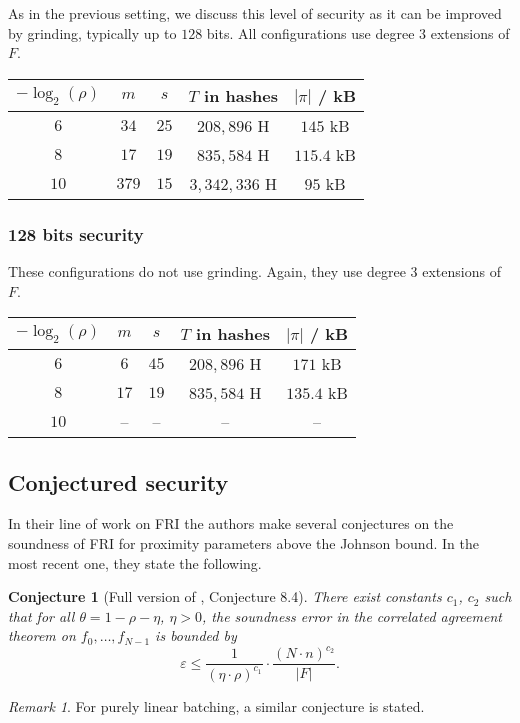 \documentclass[11pt]{article}
\newtheorem{conj}[]{Conjecture}
\theoremstyle{definition}
\theoremstyle{remark}
\newtheorem{rem}[thm]{Remark}
\begin{document}
As in the previous setting, we discuss this level of security as it can be improved by grinding, typically up to $128$ bits. 
All configurations use degree $3$ extensions of $F$.
\begin{center}
\begin{tabular}{|c|c|c|c|c|}
\hline
$-\log_2(\rho)$ & $m$	& $s$	& $T$ in hashes 	& $|\pi|$ / kB
\\\hline\hline
$6$ 	& $34$	& $25$	& $208,896$ H 	& $145$ kB
\\
$8$ & $17$	& $19$	& $835,584$ H & $115.4$ kB
\\
$10$ & $379$	& $15$	& $3,342,336$ H 	& $95$ kB
\\\hline
\end{tabular}
\end{center}

\subsubsection{128 bits security}
These configurations do not use grinding. 
Again, they use degree $3$ extensions of $F$.

\begin{center}
\begin{tabular}{|c|c|c|c|c|}
\hline
$-\log_2(\rho)$ & $m$	& $s$	& $T$ in hashes 	& $|\pi|$ / kB
\\\hline\hline
$6$ 	& $6$	& $45$	& $208,896$ H 	& $171$ kB
\\
$8$ & $17$	& $19$	& $835,584$ H & $135.4$ kB
\\
$10$ & --	& --	& --  	&  --
\\\hline
\end{tabular}
\end{center}


\subsection{Conjectured security}
\label{s:FRIConjecture}

In their line of work on FRI \cite{FRI, DEEPFRI, ProximityGaps} the authors make several conjectures on the soundness of FRI for proximity parameters above the Johnson bound. 
In the most recent one, they state the following.

\begin{conj}[Full version of \cite{ProximityGaps}, Conjecture 8.4]
\label{con:FRIsoundness}
There exist constants $c_1$, $c_2$ such that for all $\theta =1-\rho -\eta$, $\eta >0$,  the soundness error in the correlated agreement theorem on $f_0,\ldots ,f_{N-1}$ is bounded by
\[
\varepsilon \leq \frac{1}{(\eta\cdot\rho)^{c_1}} \cdot \frac{(N\cdot n)^{c_2}}{|F|}.
\]
\end{conj}
\begin{rem}
For purely linear batching, a similar conjecture is stated.
\end{rem}
\end{document}
